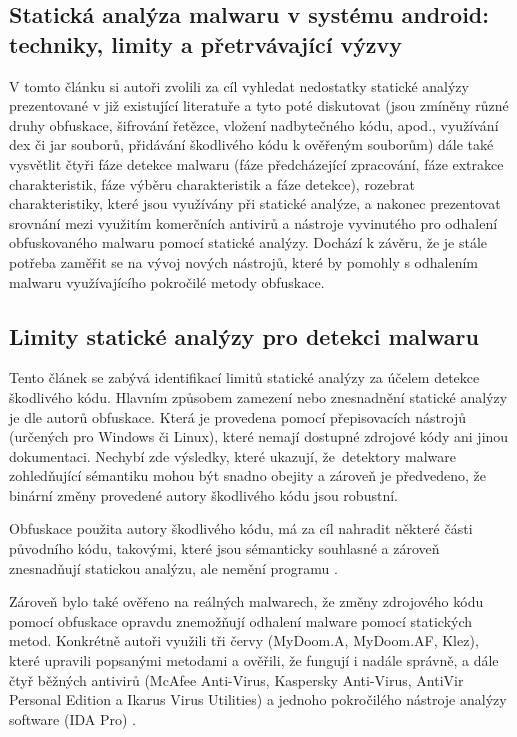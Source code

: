 \subsection{Statická analýza malwaru v systému android: techniky, limity a přetrvávající výzvy}
\label{stateofArt3_android}

V tomto článku si autoři \cite{stateOfArt3} zvolili za cíl vyhledat nedostatky statické analýzy prezentované v již existující literatuře a tyto poté diskutovat (jsou zmíněny různé druhy obfuskace, šifrování řetězce, vložení nadbytečného kódu, apod., využívání dex či jar souborů, přidávání škodlivého kódu k ověřeným souborům) dále také vysvětlit čtyři fáze detekce malwaru (fáze předcházející zpracování, fáze extrakce charakteristik, fáze výběru charakteristik a fáze detekce), rozebrat charakteristiky, které jsou využívány při statické analýze, a nakonec prezentovat srovnání mezi využitím komerčních antivirů a nástroje vyvinutého pro odhalení obfuskovaného malwaru pomocí statické analýzy. Dochází k závěru, že je stále potřeba zaměřit se na vývoj nových nástrojů, které by pomohly s odhalením malwaru využívajícího pokročilé metody obfuskace.

\subsection{Limity statické analýzy pro detekci malwaru}
\label{stateofArt4_limits}

Tento článek \cite{stateOfArt4} se zabývá identifikací limitů statické analýzy za účelem detekce škodlivého kódu. Hlavním způsobem zamezení nebo znesnadnění statické analýzy je dle autorů obfuskace. Která je provedena pomocí přepisovacích nástrojů (určených pro Windows či Linux), které nemají dostupné zdrojové kódy ani jinou dokumentaci. Nechybí zde výsledky, které ukazují, že~detektory malware zohledňující sémantiku mohou být snadno obejity a zároveň je předvedeno, že binární změny provedené autory škodlivého kódu jsou robustní.

Obfuskace použita autory škodlivého kódu, má za cíl nahradit některé části původního kódu, takovými, které jsou sémanticky souhlasné a zároveň znesnadňují statickou analýzu, ale nemění programu \cite{stateOfArt4}.

Zároveň bylo také ověřeno na reálných malwarech, že změny zdrojového kódu pomocí obfuskace opravdu znemožňují odhalení malware pomocí statických metod.
Konkrétně autoři využili tři červy (MyDoom.A, MyDoom.AF, Klez), které upravili popsanými metodami a ověřili, že fungují i nadále správně, a dále čtyř běžných antivirů (McAfee Anti-Virus, Kaspersky Anti-Virus, AntiVir Personal Edition a Ikarus Virus Utilities) a jednoho pokročilého nástroje analýzy software (IDA Pro) \cite{stateOfArt4}. 

